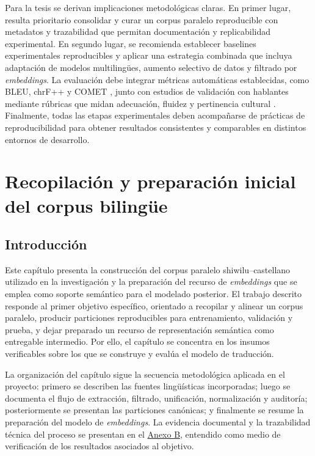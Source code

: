 \documentclass[12pt,a4paper,oneside]{book}
\begin{document}
Para la tesis se derivan implicaciones metodológicas claras. En primer lugar, resulta prioritario consolidar y curar un corpus paralelo reproducible con metadatos y trazabilidad que permitan documentación y replicabilidad experimental. En segundo lugar, se recomienda establecer baselines experimentales reproducibles y aplicar una estrategia combinada que incluya adaptación de modelos multilingües, aumento selectivo de datos y filtrado por \emph{embeddings}. La evaluación debe integrar métricas automáticas establecidas, como BLEU, chrF++ y COMET \parencite{papineni2002bleu,rei2020comet}, junto con estudios de validación con hablantes mediante rúbricas que midan adecuación, fluidez y pertinencia cultural \parencite{freitag2021,post2018}. Finalmente, todas las etapas experimentales deben acompañarse de prácticas de reproducibilidad para obtener resultados consistentes y comparables en distintos entornos de desarrollo.


\chapter{Recopilación y preparación inicial del corpus bilingüe}\label{recopilaciuxf3n-y-preparaciuxf3n-inicial-del-corpus-bilinguxfce}

\section{Introducción}\label{introducciuxf3n-2}

Este capítulo presenta la construcción del corpus paralelo shiwilu--castellano utilizado en la investigación y la preparación del recurso de \emph{embeddings} que se emplea como soporte semántico para el modelado posterior. El trabajo descrito responde al primer objetivo específico, orientado a recopilar y alinear un corpus paralelo, producir particiones reproducibles para entrenamiento, validación y prueba, y dejar preparado un recurso de representación semántica como entregable intermedio. Por ello, el capítulo se concentra en los insumos verificables sobre los que se construye y evalúa el modelo de traducción.

La organización del capítulo sigue la secuencia metodológica aplicada en el proyecto: primero se describen las fuentes lingüísticas incorporadas; luego se documenta el flujo de extracción, filtrado, unificación, normalización y auditoría; posteriormente se presentan las particiones canónicas; y finalmente se resume la preparación del modelo de \emph{embeddings}. La evidencia documental y la trazabilidad técnica del proceso se presentan en el \hyperref[anexo-documento-reproducible]{Anexo B}, entendido como medio de verificación de los resultados asociados al objetivo.
\end{document}
